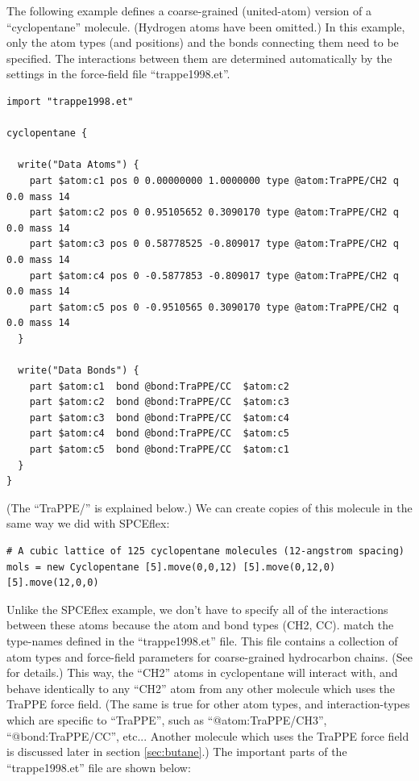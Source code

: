 \documentclass[11pt]{article}
\begin{document}
The following example defines a coarse-grained (united-atom)
version of a ``cyclopentane'' molecule. (Hydrogen atoms have been omitted.)
In this example, only the atom types (and positions) and the bonds 
connecting them need to be specified.  
The interactions between them are determined automatically 
by the settings in the force-field file ``trappe1998.et''.
\begin{verbatim}
import "trappe1998.et"

cyclopentane {

  write("Data Atoms") {
    part $atom:c1 pos 0 0.00000000 1.0000000 type @atom:TraPPE/CH2 q 0.0 mass 14
    part $atom:c2 pos 0 0.95105652 0.3090170 type @atom:TraPPE/CH2 q 0.0 mass 14
    part $atom:c3 pos 0 0.58778525 -0.809017 type @atom:TraPPE/CH2 q 0.0 mass 14
    part $atom:c4 pos 0 -0.5877853 -0.809017 type @atom:TraPPE/CH2 q 0.0 mass 14
    part $atom:c5 pos 0 -0.9510565 0.3090170 type @atom:TraPPE/CH2 q 0.0 mass 14
  }

  write("Data Bonds") {
    part $atom:c1  bond @bond:TraPPE/CC  $atom:c2
    part $atom:c2  bond @bond:TraPPE/CC  $atom:c3
    part $atom:c3  bond @bond:TraPPE/CC  $atom:c4
    part $atom:c4  bond @bond:TraPPE/CC  $atom:c5
    part $atom:c5  bond @bond:TraPPE/CC  $atom:c1
  }
}
\end{verbatim}
(The ``TraPPE/'' is explained below.)
We can create copies of this molecule in the same way we did with SPCEflex:
\begin{verbatim}
# A cubic lattice of 125 cyclopentane molecules (12-angstrom spacing)
mols = new Cyclopentane [5].move(0,0,12) [5].move(0,12,0) [5].move(12,0,0)
\end{verbatim}
Unlike the SPCEflex example, we don't have to specify all of the interactions 
between these atoms because the atom and bond types (CH2, CC).
match the type-names defined in the ``trappe1998.et'' file.
This file contains a collection of atom types and
force-field parameters for coarse-grained hydrocarbon chains.
(See \cite{TraPPE} for details.)
This way, the ``CH2'' atoms in cyclopentane will interact with, 
and behave identically to any ``CH2'' atom from any other molecule 
which uses the TraPPE force field.
(The same is true for other atom types, and interaction-types 
 which are specific to ``TraPPE'', such as
``@atom:TraPPE/CH3'', ``@bond:TraPPE/CC'', etc...
Another molecule which uses the TraPPE force field is discussed 
later in section \ref{sec:butane}.)
The important parts of the ``trappe1998.et'' file are shown below:
\end{document}
